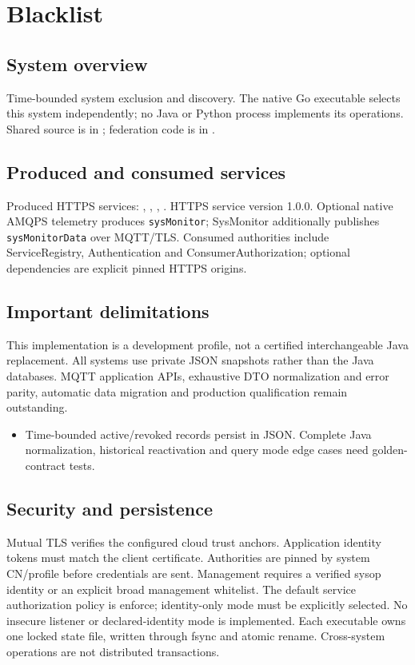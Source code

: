 \documentclass[a4paper]{arrowhead}
\begin{document}
\section{Blacklist}
\subsection{System overview}
Time-bounded system exclusion and discovery. The native Go executable selects this system independently; no Java or Python process implements its operations. Shared source is in ; federation code is in .
\subsection{Produced and consumed services}
Produced HTTPS services: , \allowbreak {}, \allowbreak {}, \allowbreak {}.
HTTPS service version 1.0.0. Optional native AMQPS telemetry produces \texttt{sysMonitor}; SysMonitor additionally publishes \texttt{sysMonitorData} over MQTT/TLS. Consumed authorities include ServiceRegistry, Authentication and ConsumerAuthorization; optional dependencies are explicit pinned HTTPS origins.
\subsection{Important delimitations}
This implementation is a development profile, not a certified interchangeable Java replacement. All systems use private JSON snapshots rather than the Java databases. MQTT application APIs, exhaustive DTO normalization and error parity, automatic data migration and production qualification remain outstanding.
\begin{itemize}
\item Time-bounded active/revoked records persist in JSON. Complete Java normalization, historical reactivation and query mode edge cases need golden-contract tests.
\end{itemize}
\subsection{Security and persistence}
Mutual TLS verifies the configured cloud trust anchors. Application identity tokens must match the client certificate. Authorities are pinned by system CN/profile before credentials are sent. Management requires a verified sysop identity or an explicit broad management whitelist. The default service authorization policy is enforce; identity-only mode must be explicitly selected. No insecure listener or declared-identity mode is implemented. Each executable owns one locked state file, written through fsync and atomic rename. Cross-system operations are not distributed transactions.
\clearpage
\end{document}
